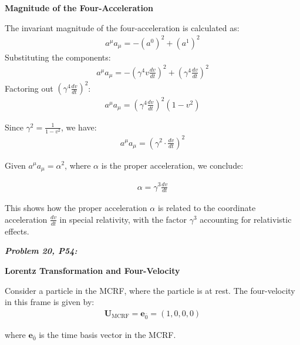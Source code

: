 \documentclass[11pt,letterpaper]{book}
\begin{document}
            \textbf{Magnitude of the Four-Acceleration}
            
            The invariant magnitude of the four-acceleration is calculated as:
            \begin{align}
            a^\mu a_\mu = -(a^0)^2 + (a^1)^2
            \end{align}
            Substituting the components:
            \begin{align}
            a^\mu a_\mu = -\left(\gamma^4 v \frac{dv}{dt}\right)^2 + \left(\gamma^4 \frac{dv}{dt}\right)^2
            \end{align}
            Factoring out \( \left(\gamma^4 \frac{dv}{dt}\right)^2 \):
            \begin{align}
            a^\mu a_\mu = \left(\gamma^4 \frac{dv}{dt}\right)^2 \left(1 - v^2\right)
            \end{align}
            
            Since \( \gamma^2 = \frac{1}{1 - v^2} \), we have:
            \begin{align}
            a^\mu a_\mu = \left(\gamma^2 \cdot \frac{dv}{dt}\right)^2
            \end{align}
            
            Given \( a^\mu a_\mu = \alpha^2 \), where \( \alpha \) is the proper acceleration, we conclude:
            
            \begin{align}
            \alpha = \gamma^3 \frac{dv}{dt}
            \end{align}
            
            This shows how the proper acceleration \( \alpha \) is related to the coordinate acceleration \( \frac{dv}{dt} \) in special relativity, with the factor \( \gamma^3 \) accounting for relativistic effects.

        \textbf{\textit{Problem 20, P54:}}
        
            \textbf{Lorentz Transformation and Four-Velocity}

            Consider a particle in the MCRF, where the particle is at rest. The four-velocity in this frame is given by:
            \begin{align}
            \mathbf{U}_{\text{MCRF}} = \mathbf{e}_{\bar{0}} = (1, 0, 0, 0)
            \end{align}
            
            where \( \mathbf{e}_{\bar{0}} \) is the time basis vector in the MCRF.
            
\end{document}
